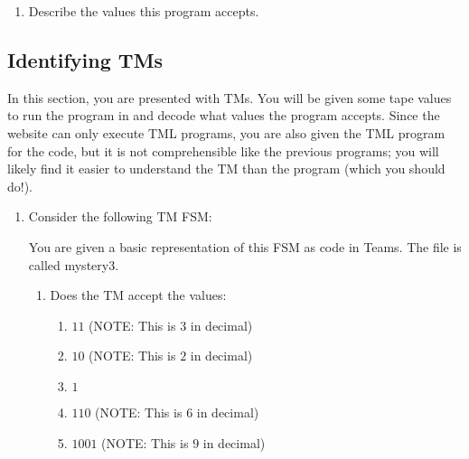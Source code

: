 \begin{appendices}
\begin{enumerate}
\begin{enumerate}
        \item Describe the values this program accepts.
    \end{enumerate}
\end{enumerate}

\newpage

\subsection{Identifying TMs}
In this section, you are presented with TMs. You will be given some tape values to run the program in and decode what values the program accepts. Since the website can only execute TML programs, you are also given the TML program for the code, but it is not comprehensible like the previous programs; you will likely find it easier to understand the TM than the program (which you should do!). 
\begin{enumerate}
    \item Consider the following TM FSM:
    \begin{figure}[H]
        \centering
    \end{figure}
    You are given a basic representation of this FSM as code in Teams. The file is called mystery3.
    \begin{enumerate}
        \item Does the TM accept the values:
        \begin{enumerate}
            \item $11$ (NOTE: This is $3$ in decimal)
            \item $10$ (NOTE: This is $2$ in decimal)
            \item $1$
            \item $110$ (NOTE: This is $6$ in decimal)
            \item $1001$ (NOTE: This is $9$ in decimal)
        \end{enumerate}
        

\end{enumerate}
\end{enumerate}
\end{appendices}
